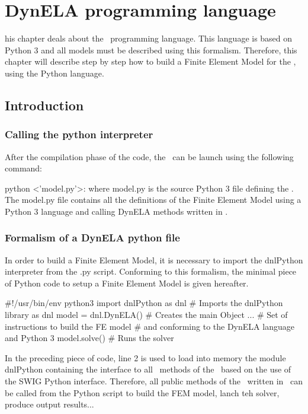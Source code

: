 
\chapter{DynELA programming language}

\startcontents[chapters]
\printmyminitoc[1]his chapter deals about the \Dynela~programming language.
This language is based on Python 3 and all models must be described
using this formalism. Therefore, this chapter will describe step by
step how to build a Finite Element Model for the \Dynela, using the
Python language.

\section{Introduction}

\subsection{Calling the python interpreter}

After the compilation phase of the code, the \Dynela~can be launch
using the following command:

\textsf{python <'model.py'>}: where model.py is the source Python
3 file defining the \Dynela. The \textsf{model.py }file contains
all the definitions of the Finite Element Model using a Python 3 language
and calling DynELA methods written in \Cpp.

\subsection{Formalism of a DynELA python file}

In order to build a Finite Element Model, it is necessary to import
the \textsf{dnlPython} interpreter from the \textsf{.py} script. Conforming
to this formalism, the minimal piece of Python code to setup a Finite
Element Model is given hereafter.

\begin{PythonListing}
#!/usr/bin/env python3
import dnlPython as dnl # Imports the dnlPython library as dnl
model = dnl.DynELA()    # Creates the main Object
...                     # Set of instructions to build the FE model
                        # and conforming to the DynELA language and Python 3
model.solve()           # Runs the solver
\end{PythonListing}

In the preceding piece of code, line 2 is used to load into memory
the module dnlPython containing the interface to all \Cpp~methods
of the \Dynela~based on the use of the SWIG Python interface. Therefore,
all public methods of the \Dynela~written in \Cpp~can be called
from the Python script to build the FEM model, lanch teh solver, produce
output results... 

